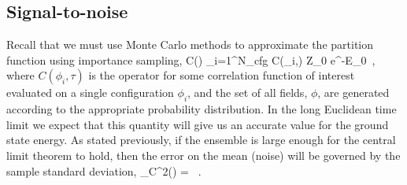 \subsection{\label{sec:SNR}Signal-to-noise}
Recall that we must use Monte Carlo methods to approximate the partition function using importance sampling,
\beq
C(\tau) \approx {} \sum_{i=1}^{N_{\mbox{\tiny cfg}}} C(\phi_i,\tau) \tautoinfty Z_0 e^{-E_0\tau}\ ,
\eeq
where $C(\phi_i,\tau)$ is the operator for some correlation function of interest evaluated on a single configuration $\phi_i$, and the set of all fields, $\phi$, are generated according to the appropriate probability distribution. In the long Euclidean time limit we expect that this quantity will give us an accurate value for the ground state energy. As stated previously, if the ensemble is large enough for the central limit theorem to hold, then the error on the mean (noise) will be governed by the sample standard deviation,
\beq
\sigma_C^2(\tau) = \left[ \sum_{i=1}^{N_{\mbox{\tiny cfg}}}|C(\phi_i,\tau)|^2 - \left|\sum_{i=1}^{N_{\mbox{\tiny cfg}}}C(\phi_i,\tau)\right|^2\right] \ .
\eeq

